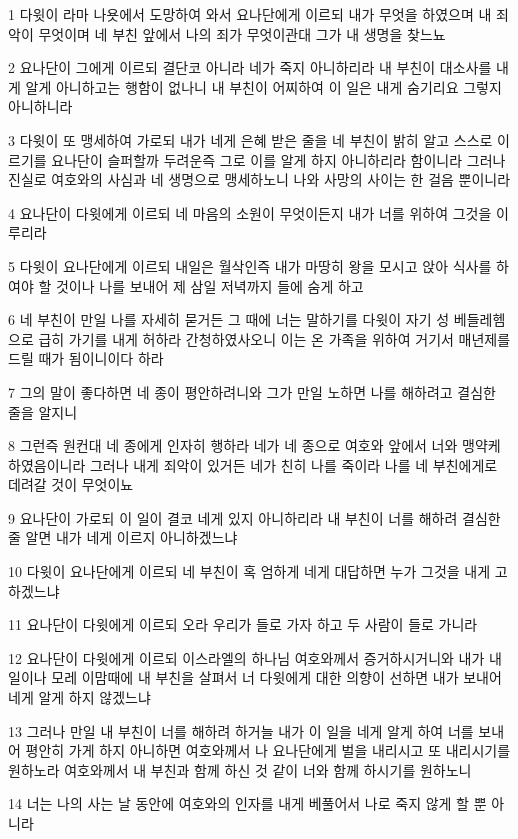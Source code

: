 \par 1 다윗이 라마 나욧에서 도망하여 와서 요나단에게 이르되 내가 무엇을 하였으며 내 죄악이 무엇이며 네 부친 앞에서 나의 죄가 무엇이관대 그가 내 생명을 찾느뇨
\par 2 요나단이 그에게 이르되 결단코 아니라 네가 죽지 아니하리라 내 부친이 대소사를 내게 알게 아니하고는 행함이 없나니 내 부친이 어찌하여 이 일은 내게 숨기리요 그렇지 아니하니라
\par 3 다윗이 또 맹세하여 가로되 내가 네게 은혜 받은 줄을 네 부친이 밝히 알고 스스로 이르기를 요나단이 슬퍼할까 두려운즉 그로 이를 알게 하지 아니하리라 함이니라 그러나 진실로 여호와의 사심과 네 생명으로 맹세하노니 나와 사망의 사이는 한 걸음 뿐이니라
\par 4 요나단이 다윗에게 이르되 네 마음의 소원이 무엇이든지 내가 너를 위하여 그것을 이루리라
\par 5 다윗이 요나단에게 이르되 내일은 월삭인즉 내가 마땅히 왕을 모시고 앉아 식사를 하여야 할 것이나 나를 보내어 제 삼일 저녁까지 들에 숨게 하고
\par 6 네 부친이 만일 나를 자세히 묻거든 그 때에 너는 말하기를 다윗이 자기 성 베들레헴으로 급히 가기를 내게 허하라 간청하였사오니 이는 온 가족을 위하여 거기서 매년제를 드릴 때가 됨이니이다 하라
\par 7 그의 말이 좋다하면 네 종이 평안하려니와 그가 만일 노하면 나를 해하려고 결심한 줄을 알지니
\par 8 그런즉 원컨대 네 종에게 인자히 행하라 네가 네 종으로 여호와 앞에서 너와 맹약케 하였음이니라 그러나 내게 죄악이 있거든 네가 친히 나를 죽이라 나를 네 부친에게로 데려갈 것이 무엇이뇨
\par 9 요나단이 가로되 이 일이 결코 네게 있지 아니하리라 내 부친이 너를 해하려 결심한줄 알면 내가 네게 이르지 아니하겠느냐
\par 10 다윗이 요나단에게 이르되 네 부친이 혹 엄하게 네게 대답하면 누가 그것을 내게 고하겠느냐
\par 11 요나단이 다윗에게 이르되 오라 우리가 들로 가자 하고 두 사람이 들로 가니라
\par 12 요나단이 다윗에게 이르되 이스라엘의 하나님 여호와께서 증거하시거니와 내가 내일이나 모레 이맘때에 내 부친을 살펴서 너 다윗에게 대한 의향이 선하면 내가 보내어 네게 알게 하지 않겠느냐
\par 13 그러나 만일 내 부친이 너를 해하려 하거늘 내가 이 일을 네게 알게 하여 너를 보내어 평안히 가게 하지 아니하면 여호와께서 나 요나단에게 벌을 내리시고 또 내리시기를 원하노라 여호와께서 내 부친과 함께 하신 것 같이 너와 함께 하시기를 원하노니
\par 14 너는 나의 사는 날 동안에 여호와의 인자를 내게 베풀어서 나로 죽지 않게 할 뿐 아니라
